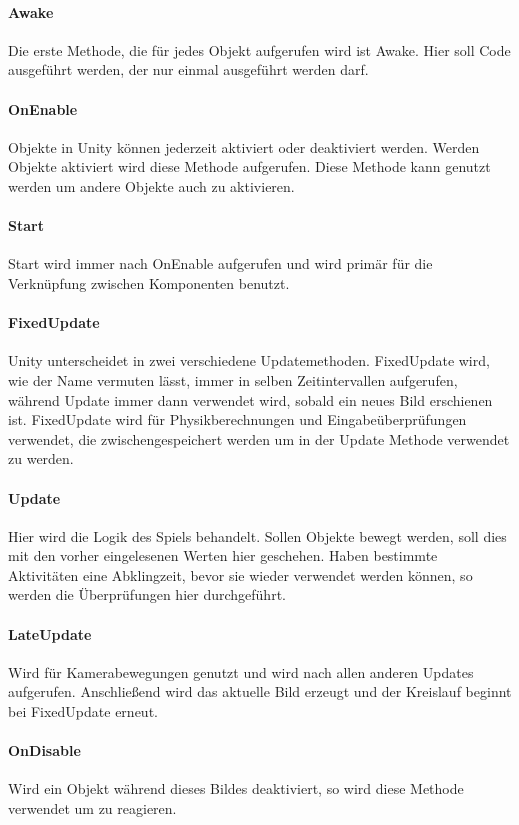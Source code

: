\paragraph{Awake}
Die erste Methode, die für jedes Objekt aufgerufen wird ist Awake. Hier soll Code ausgeführt werden, der nur einmal ausgeführt werden darf.
\paragraph{OnEnable}
Objekte in Unity können jederzeit aktiviert oder deaktiviert werden. Werden Objekte aktiviert wird diese Methode aufgerufen. Diese Methode kann genutzt werden um andere Objekte auch zu aktivieren.
\paragraph{Start}
Start wird immer nach OnEnable aufgerufen und wird primär für die Verknüpfung zwischen Komponenten benutzt.
\paragraph{FixedUpdate}
Unity unterscheidet in zwei verschiedene Updatemethoden. FixedUpdate wird, wie der Name vermuten lässt, immer in selben Zeitintervallen aufgerufen, während Update immer dann verwendet wird, sobald ein neues Bild erschienen ist. FixedUpdate wird für Physikberechnungen und Eingabeüberprüfungen verwendet, die zwischengespeichert werden um in der Update Methode verwendet zu werden.
\paragraph{Update}
Hier wird die Logik des Spiels behandelt. Sollen Objekte bewegt werden, soll dies mit den vorher eingelesenen Werten hier geschehen. Haben bestimmte Aktivitäten eine Abklingzeit, bevor sie wieder verwendet werden können, so werden die Überprüfungen hier durchgeführt.
\paragraph{LateUpdate}
Wird für Kamerabewegungen genutzt und wird nach allen anderen Updates aufgerufen.
Anschließend wird das aktuelle Bild erzeugt und der Kreislauf beginnt bei FixedUpdate erneut.
\paragraph{OnDisable}
Wird ein Objekt während dieses Bildes deaktiviert, so wird diese Methode verwendet um zu reagieren. 
